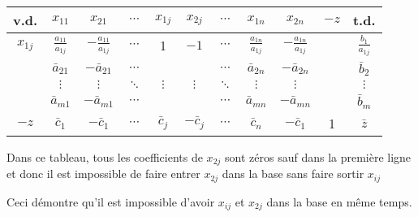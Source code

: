 \begin{center}
	\renewcommand{\arraystretch}{1.5}
	\begin{tabular}{|c|ccccccccc|c|}
		\hline
		  v.d.   &        $x_{11}$         &         $x_{21}$         & $\cdots$ &  $x_{1j}$   &   $x_{2j}$   & $\cdots$ &        $x_{1n}$         &         $x_{2n}$         & $-z$ &          t.d.          \\ \hline
		$x_{1j}$ & $\frac{a_{11}}{a_{1j}}$ & $-\frac{a_{11}}{a_{1j}}$ & $\cdots$ &      1      &     $-1$     & $\cdots$ & $\frac{a_{1n}}{a_{1j}}$ & $-\frac{a_{1n}}{a_{1j}}$ &      & $\frac{b_{1}}{a_{1j}}$ \\
		         &     $\bar{a}_{21}$      &     $-\bar{a}_{21}$      & $\cdots$ &             &              & $\cdots$ &     $\bar{a}_{2n}$      &     $-\bar{a}_{2n}$      &      &     $\bar{b}_{2}$      \\
		         &        $\vdots$         &         $\vdots$         & $\ddots$ &  $\vdots$   &   $\vdots$   & $\ddots$ &        $\vdots$         &         $\vdots$         &      &        $\vdots$        \\
		         &     $\bar{a}_{m1}$      &     $-\bar{a}_{m1}$      & $\cdots$ &             &              & $\cdots$ &     $\bar{a}_{mn}$      &     $-\bar{a}_{mn}$      &      &      $\bar{b}_m$       \\ \hline
		  $-z$   &      $\bar{c}_{1}$      &       $-\bar{c}_1$       & $\cdots$ & $\bar{c}_j$ & $-\bar{c}_j$ & $\cdots$ &       $\bar{c}_n$       &       $-\bar{c}_1$       &  1   &       $\bar{z}$        \\ \hline
	\end{tabular}
\end{center}

Dans ce tableau, tous les coefficients de $x_{2j}$ sont zéros sauf dans la première ligne et donc il est impossible de faire entrer $x_{2j}$ dans la base sans faire sortir $x_{ij}$

Ceci démontre qu’il est impossible d’avoir $x_{ij}$ et $x_{2j}$ dans la base en même temps.
